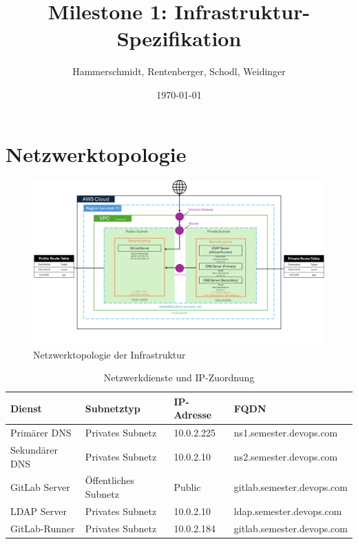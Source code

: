 \documentclass[a4paper,12pt]{article}
\title{Milestone 1: Infrastruktur-Spezifikation}
\author{Hammerschmidt, Rentenberger, Schodl, Weidinger}
\date{\today}
\begin{document}
\maketitle
\tableofcontents
\newpage

\section{Netzwerktopologie}

\begin{figure}[h!]
	\centering
	\includegraphics[width=\textwidth]{data/DevOps_Network_Topology.png}
	\caption{Netzwerktopologie der Infrastruktur}
	\label{fig:network_topology}
\end{figure}

\begin{table}[h!]
	\centering
	\begin{tabular}{|l|l|l|l|}
		\hline
		\textbf{Dienst} & \textbf{Subnetztyp}  & \textbf{IP-Adresse} & \textbf{FQDN}      \\ \hline
		Primärer DNS    & Privates Subnetz     & 10.0.2.225          & ns1.semester.devops.com   \\ \hline
		Sekundärer DNS  & Privates Subnetz     & 10.0.2.10           & ns2.semester.devops.com   \\ \hline
		GitLab Server   & Öffentliches Subnetz & Public              & gitlab.semester.devops.com \\ \hline
		LDAP Server     & Privates Subnetz     & 10.0.2.10           & ldap.semester.devops.com   \\ \hline
		GitLab-Runner	& Privates Subnetz	   & 10.0.2.184			 & gitlab.semester.devops.com \\ \hline
	\end{tabular}
	\caption{Netzwerkdienste und IP-Zuordnung}
\end{table}
\end{document}
